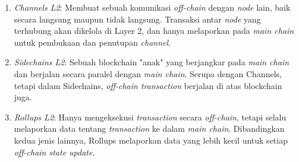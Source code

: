 \begin{enumerate}
	\item \textit{Channels L2}: Membuat sebuah komunikasi \textit{off-chain} dengan \textit{node} lain, baik secara langsung maupun tidak langsung. Transaksi antar \textit{node} yang terhubung akan dikelola di Layer 2, dan hanya melaporkan pada \textit{main chain} untuk pembukaan dan penutupan \textit{channel}.
	\item \textit{Sidechains L2}: Sebuah blockchain "anak" yang berjangkar pada \textit{main chain} dan berjalan secara paralel dengan \textit{main chain}. Serupa dengan Channels, tetapi dalam Sidechains, \textit{off-chain transaction} berjalan di atas blockchain juga.
	\item \textit{Rollups L2}: Hanya mengeksekusi \textit{transaction} secara \textit{off-chain}, tetapi selalu melaporkan data tentang \textit{transaction} ke dalam \textit{main chain}. Dibandingkan kedua jenis lainnya, Rollups melaporkan data yang lebih kecil untuk setiap \textit{off-chain state update}.
\end{enumerate}






